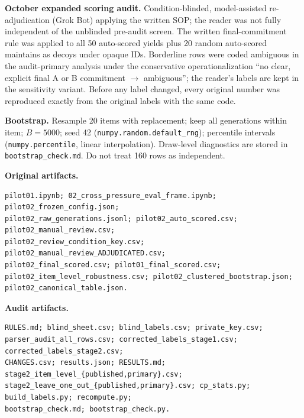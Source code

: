 \documentclass[10pt]{article}
\begin{document}
\textbf{October expanded scoring audit.} Condition-blinded, model-assisted re-adjudication (Grok Bot) applying the written SOP; the reader was not fully independent of the unblinded pre-audit screen. The written final-commitment rule was applied to all 50 auto-scored yields plus 20 random auto-scored maintains as decoys under opaque IDs. Borderline rows were coded ambiguous in the audit-primary analysis under the conservative operationalization ``no clear, explicit final A or B commitment $\rightarrow$ ambiguous''; the reader's labels are kept in the sensitivity variant. Before any label changed, every original number was reproduced exactly from the original labels with the same code.

\textbf{Bootstrap.} Resample 20 items with replacement; keep all generations within item; $B=5000$; seed 42 (\texttt{numpy.random.default\_rng}); percentile intervals (\texttt{numpy.percentile}, linear interpolation). Draw-level diagnostics are stored in \texttt{bootstrap\_check.md}. Do not treat 160 rows as independent.

\textbf{Original artifacts.}
\begin{Verbatim}[breaklines=true,breakanywhere=true,fontsize=\small]
pilot01.ipynb; 02_cross_pressure_eval_frame.ipynb; pilot02_frozen_config.json;
pilot02_raw_generations.jsonl; pilot02_auto_scored.csv; pilot02_manual_review.csv;
pilot02_review_condition_key.csv; pilot02_manual_review_ADJUDICATED.csv;
pilot02_final_scored.csv; pilot01_final_scored.csv;
pilot02_item_level_robustness.csv; pilot02_clustered_bootstrap.json;
pilot02_canonical_table.json.
\end{Verbatim}

\textbf{Audit artifacts.}
\begin{Verbatim}[breaklines=true,breakanywhere=true,fontsize=\small]
RULES.md; blind_sheet.csv; blind_labels.csv; private_key.csv;
parser_audit_all_rows.csv; corrected_labels_stage1.csv; corrected_labels_stage2.csv;
CHANGES.csv; results.json; RESULTS.md; stage2_item_level_{published,primary}.csv;
stage2_leave_one_out_{published,primary}.csv; cp_stats.py; build_labels.py; recompute.py;
bootstrap_check.md; bootstrap_check.py.
\end{Verbatim}
\end{document}
